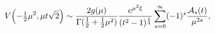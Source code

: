 \[\mathop{V\/}\nolimits\!\left(-\tfrac{1}{2}\mu^{2},\mu t\sqrt{2}\right)\sim%
\frac{2g(\mu)}{\mathop{\Gamma\/}\nolimits(\frac{1}{2}+\frac{1}{2}\mu^{2})}%
\frac{e^{\mu^{2}\xi}}{(t^{2}-1)^{\frac{1}{4}}}\*\sum_{s=0}^{\infty}(-1)^{s}%
\frac{{\cal A}_{s}(t)}{\mu^{2s}},\]